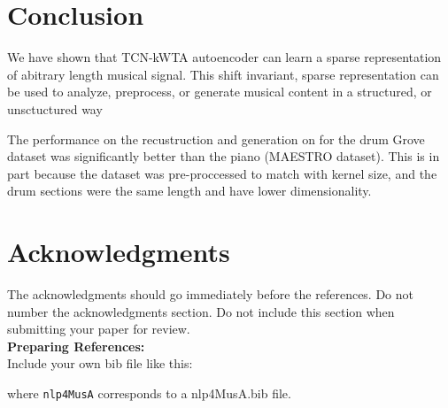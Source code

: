 \documentclass[11pt,a4paper]{article}
\begin{document}
\section{Conclusion}

%
%


We have shown that TCN-kWTA autoencoder can learn a sparse representation of abitrary length musical signal. This shift invariant, sparse representation can be used to analyze, preprocess, or generate musical content in a structured, or unsctuctured way

The performance on the recustruction and generation on for the drum Grove dataset  was significantly better than the piano (MAESTRO dataset). This is in part because the dataset was pre-proccessed to match with kernel size, and the drum sections were the same length and have lower dimensionality. 


\section*{Acknowledgments}

The acknowledgments should go immediately before the references.  Do
not number the acknowledgments section. Do not include this section
when submitting your paper for review. \\

\noindent \textbf{Preparing References:} \\
Include your own bib file like this:
\verb||
\verb|| 

where \verb|nlp4MusA| corresponds to a nlp4MusA.bib file.




\appendix
\end{document}
